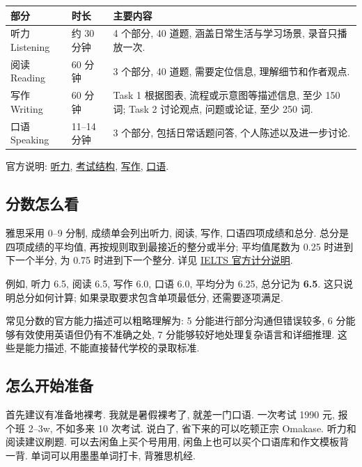 \documentclass[UTF8,a4paper,12pt]{ctexart}
\newif\ifcourseopen
\newif\ifcourseheaderprinted
\newcounter{courseitem}
\newcommand{\finishcourse}{%
 \ifcourseopen
 \par\end{minipage}\end{tcolorbox}%
 \courseopenfalse
 \fi
}
\newcommand{\coursereset}{\finishcourse\setcounter{courseitem}{0}\courseheaderprintedfalse}
\newcommand{\official}[2]{\href{#1}{#2}}
\let\origsubsection\subsection
\renewcommand{\subsection}{\coursereset\origsubsection}
\begin{document}
\begin{longtable}{p{}p{}p{}}
\toprule
\textbf{部分} & \textbf{时长} & \textbf{主要内容}\\
\midrule
听力 Listening & 约 30 分钟 & 4 个部分, 40 道题, 涵盖日常生活与学习场景, 录音只播放一次.\\
阅读 Reading & 60 分钟 & 3 个部分, 40 道题, 需要定位信息, 理解细节和作者观点.\\
写作 Writing & 60 分钟 & Task 1 根据图表, 流程或示意图等描述信息, 至少 150 词; Task 2 讨论观点, 问题或论证, 至少 250 词.\\
口语 Speaking & 11--14 分钟 & 3 个部分, 包括日常话题问答, 个人陈述以及进一步讨论.\\
\bottomrule
\end{longtable}

官方说明: \official{https://ielts.org/take-a-test/test-types/ielts-academic-test/ielts-academic-format-listening}{听力}, \official{https://ielts.org/take-a-test/test-types/ielts-academic-test}{考试结构}, \official{https://ielts.org/take-a-test/test-types/ielts-academic-test/ielts-academic-format-writing}{写作}, \official{https://ielts.org/take-a-test/test-types/ielts-academic-test/ielts-academic-format-speaking}{口语}.

\subsection{分数怎么看}

雅思采用 0--9 分制, 成绩单会列出听力, 阅读, 写作, 口语四项成绩和总分. 总分是四项成绩的平均值, 再按规则取到最接近的整分或半分; 平均值尾数为 0.25 时进到下一个半分, 为 0.75 时进到下一个整分. 详见 \official{https://ielts.org/take-a-test/your-results/ielts-scoring-in-detail}{IELTS 官方计分说明}.

例如, 听力 6.5, 阅读 6.5, 写作 6.0, 口语 6.0, 平均分为 6.25, 总分记为 \textbf{6.5}. 这只说明总分如何计算; 如果录取要求包含单项最低分, 还需要逐项满足.

常见分数的官方能力描述可以粗略理解为: 5 分能进行部分沟通但错误较多, 6 分能够有效使用英语但仍有不准确之处, 7 分能够较好地处理复杂语言和详细推理. 这些是能力描述, 不能直接替代学校的录取标准.

\subsection{怎么开始准备}
首先建议有准备地裸考. 我就是暑假裸考了, 就差一门口语. 一次考试 1990 元, 报个班 2--3w, 不如多来 10 次考试. 说白了, 省下来的可以吃顿正宗 Omakase.
听力和阅读建议刷题. 可以去闲鱼上买个号用用, 闲鱼上也可以买个口语库和作文模板背一背. 单词可以用墨墨单词打卡, 背雅思机经. 
\end{document}
